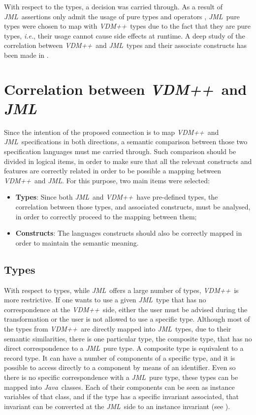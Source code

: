 \documentclass{llncs}
\newcommand{\jml}{\textit{JML}}
\newcommand{\vpp}{\textit{VDM++}}
\newcommand{\java}{\textit{Java}}
\newcommand{\ie}{\textit{i.e.}}
\begin{document}
With respect to the types, a decision was carried through. As a result of \jml\ assertions only admit the usage of pure types and operators \cite{leavens-Baker-Ruby99b}, \jml\ pure types were chosen to map with \vpp\ types due to the fact that they are pure types, \ie, their usage cannot cause side effects at runtime. A deep study of the correlation between \vpp\ and \jml\ types and their associate constructs has been made in \cite{vppjmlthesis}.

\section{Correlation between \vpp\ and \jml}
\label{sec:correlation}

Since the intention of the proposed connection is to map \vpp\ and \jml\ specifications in both directions, a semantic comparison between those two specification languages must me carried through. Such comparison should be divided in logical items, in order to make sure that all the relevant constructs and features are correctly related in order to be possible a mapping between \vpp\ and \jml. For this purpose, two main items were selected:

\begin{itemize}
\item{\textbf{Types}:} Since both \jml\ and \vpp\ have pre-defined types, the correlation between those types, and associated constructs, must be analysed, in order to correctly proceed to the mapping between them; 
\item{\textbf{Constructs}:} The languages constructs should also be correctly mapped in order to maintain the semantic meaning.
\end{itemize}

\subsection{Types}
\label{types}

With respect to types, while \jml\ offers a large number of types, \vpp\ is more restrictive. If one wants to use a given \jml\ type that has no correspondence at the \vpp\ side, either the user must be advised during the transformation or the user is not allowed to use a specific type. 
Although most of the types from \vpp\ are directly mapped into \jml\ types, due to their semantic similarities, there is one particular type, the composite type, that has no direct correspondence to a \jml\ pure type. A composite type is equivalent to a record type. It can have a number of components of a specific type, and it is possible to access directly to a component by means of an identifier. Even so there is no specific correspondence with a \jml\ pure type, these types can be mapped into \java\ classes. Each of their components can be seen as instance variables of that class, and if the type has a specific invariant associated, that invariant can be converted at the \jml\ side to an instance invariant (see \cite{vppjmlthesis}).
\end{document}
